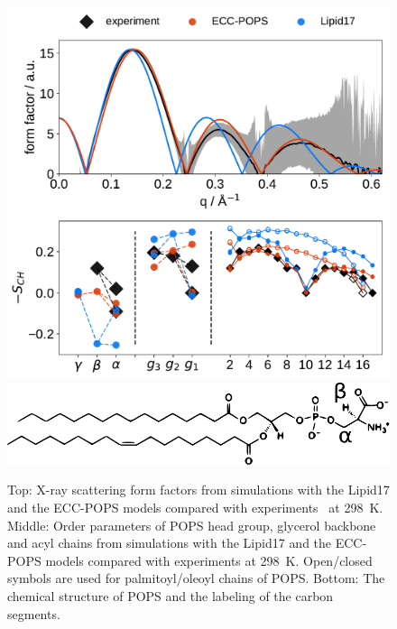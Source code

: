 \documentclass[journal=jpcbfk,manuscript=article]{achemso}
\newlength{\figwidth}
\begin{document}
\begin{figure}[tb!] 
  \centering 
  \includegraphics[width=\figwidth]{../img/ecc_pops/Order-parameters_form-factors_exp-L17-ECC-lipids.pdf}
  \includegraphics[width=\figwidth]{../img/ecc_pops/pops_chemfig.pdf} 
\hfill
  \caption{\label{simVSexpNOions_POPS} 
    Top: X-ray scattering form factors from simulations with the Lipid17 \citep{lipid17-future} and 
    the ECC-POPS models compared with experiments~\citep{kucerka14} at 298~K. 
    Middle: Order parameters of POPS head group, glycerol backbone and acyl chains  
    from simulations with the Lipid17 \citep{lipid17-future} and the ECC-POPS models 
    compared with experiments at 298~K. \citep{nmrlipids_proj4}
    Open/closed symbols are used for palmitoyl/oleoyl chains of POPS. 
    Bottom: The chemical structure of POPS and the labeling of the carbon segments. 
  }  
\end{figure} 
 
\end{document}
